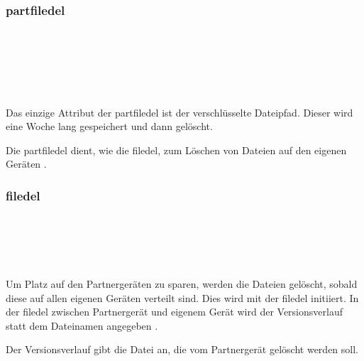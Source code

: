 \subsubsection{\gls{partfiledel}}
\messagestart
	\begin{rightwordgroup}{\isprotomsgtype}
	\end{rightwordgroup} \\
	
	\begin{rightwordgroup}{\isprotomsgdata}
		 \\
		\skippedwords \\
		 \\
	\end{rightwordgroup}
\begin{description}
	Das einzige Attribut der \gls{partfiledel} ist der verschlüsselte Dateipfad. Dieser wird eine Woche lang gespeichert und dann gelöscht.
\end{description}
Die \gls{partfiledel} dient, wie die \gls{filedel}, zum Löschen von Dateien auf den eigenen Geräten .

\subsubsection{\gls{filedel}}
\messagestart
	\begin{rightwordgroup}{\isprotomsgtype}
	\end{rightwordgroup}\\
	
	\begin{rightwordgroup}{\isprotomsgdata}
		 \\
		\skippedwords \\
	\end{rightwordgroup}
Um Platz auf den Partnergeräten zu sparen, werden die Dateien gelöscht, sobald diese auf allen eigenen Geräten verteilt sind. Dies wird mit der \gls{filedel} initiiert. In der \gls{filedel} zwischen Partnergerät und eigenem Gerät wird der Versionsverlauf statt dem Dateinamen angegeben .
\begin{description}
	Der Versionsverlauf gibt die Datei an, die vom Partnergerät gelöscht werden soll. 
\end{description}